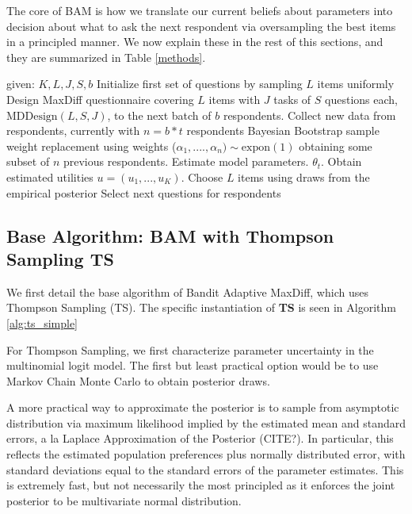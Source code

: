 \documentclass[a4paper,12pt]{article}
\newcommand{\ts}{\textbf{TS} }
\newcommand{\numperset}{L}
\begin{document}
The core of BAM is how we translate our current beliefs about parameters into decision about what to ask the next respondent via oversampling the best items in a principled manner. We now explain these in the rest of this sections, and they are summarized in Table \ref{methods}.


\begin{algorithm}
\caption{Bandit Adaptive MaxDiff: \ts} \label{alg:ts_simple}
\begin{algorithmic}[1]
\State given: $K,\numperset,J,S,b$
\State Initialize first set of questions by sampling $\numperset$ items uniformly
\State Design MaxDiff questionnaire covering $\numperset$ items with $J$ tasks of $S$ questions each, $\text{MDDesign}(L,S,J)$, to the next batch of $b$ respondents.
\State Collect new data from respondents, currently with $n = b*t$ respondents
\State Bayesian Bootstrap sample weight replacement using weights ($\alpha_1, ...., \alpha_n)\sim \text{expon}(1)$ obtaining some subset of $n$ previous respondents.
\State Estimate model parameters. $\theta_t$. Obtain estimated utilities $u = (u_1,...,u_K)$.
\State Choose $\numperset$ items using draws from the empirical posterior
\State Select next questions for respondents
\end{algorithmic}
\end{algorithm}


\subsection{Base Algorithm: BAM with Thompson Sampling \ts}

We first detail the base algorithm of Bandit Adaptive MaxDiff, which uses Thompson Sampling (TS). The specific instantiation of \ts is seen in Algorithm \ref{alg:ts_simple}
  
For Thompson Sampling, we first characterize parameter uncertainty in the multinomial logit model. The first but least practical option would be to use Markov Chain Monte Carlo to obtain posterior draws.

A more practical way to approximate the posterior is to sample from asymptotic distribution via maximum likelihood implied by the estimated mean and standard errors, a la Laplace Approximation of the Posterior (CITE?). In particular, this reflects the estimated population preferences plus normally distributed error, with standard deviations equal to the standard errors of the parameter estimates. This is extremely fast, but not necessarily the most principled as it enforces the joint posterior to be multivariate normal distribution. 
\end{document}
